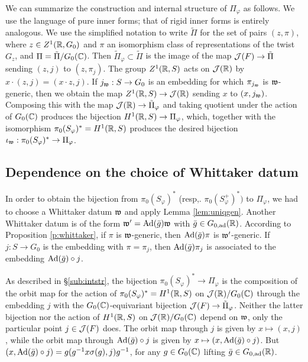 \documentclass{article}
\theoremstyle{definition}
\numberwithin{equation}{section}
\renewcommand{\-}{\hyp{}}
\begin{document}
We can summarize the construction and internal structure of $\Pi_\varphi$ as follows. We use the language of pure inner forms; that of rigid inner forms is entirely analogous. We use the simplified notation to write $\tilde\Pi$ for the set of pairs $(z,\pi)$, where $z \in Z^1(\mathbb{R},G_0)$ and $\pi$ an isomorphism class of representations of the twist $G_z$, and $\Pi=\tilde\Pi/G_0(\mathbb{C})$. Then $\tilde\Pi_\varphi \subset \tilde\Pi$ is the image of the map $\mathcal{J}(F) \to \tilde\Pi$ sending $(z,j)$ to $(z,\pi_j)$. The group $Z^1(\mathbb{R},S)$ acts on $\mathcal{J}(\mathbb{R})$ by $x\cdot (z,j)=(x \cdot z,j)$. If $j_{\mathfrak{w}} : S \to G_0$ is an embedding for which $\pi_{j_{\mathfrak{w}}}$ is $\mathfrak{w}$-generic, then we obtain the map $Z^1(\mathbb{R},S) \to \mathcal{J}(\mathbb{R})$ sending $x$ to $(x,j_{\mathfrak{w}})$. Composing this with the map $\mathcal{J}(\mathbb{R}) \to \tilde\Pi_\varphi$ and taking quotient under the action of $G_0(\mathbb{C})$ produces the bijection $H^1(\mathbb{R},S) \to \Pi_\varphi$, which, together with the isomorphism $\pi_0(S_\varphi)^*=H^1(\mathbb{R},S)$ produces the desired bijection $\iota_{\mathfrak{w}} : \pi_0(S_\varphi)^* \to \Pi_\varphi$.

\subsection{Dependence on the choice of Whittaker datum} \label{sub:whitdep}

In order to obtain the bijection from $\pi_0(S_\varphi)^*$ (resp,. $\pi_0(S_\varphi^+)^*)$ to $\Pi_\varphi$, we had to choose a Whittaker datum $\mathfrak{w}$ and apply Lemma \ref{lem:uniqgen}. Another Whittaker datum is of the form $\mathfrak{w'}=\textrm{Ad}(\bar g)\mathfrak{w}$ with $\bar g \in G_{0,\textrm{ad}}(\mathbb{R})$. According to Proposition \ref{p:whittaker}, if $\pi$ is $\mathfrak{w}$-generic, then $\textrm{Ad}(\bar g)\pi$ is $\mathfrak{w'}$-generic. If $j : S \to G_0$ is the embedding with $\pi=\pi_j$, then $\textrm{Ad}(\bar g)\pi_j$ is associated to the embedding $\textrm{Ad}(\bar g)\circ j$.

As described in \S\ref{sub:intstr}, the bijection $\pi_0(S_\varphi)^* \to \Pi_\varphi$ is the composition of the orbit map for the action of $\pi_0(S_\varphi)^*=H^1(\mathbb{R},S)$ on $\mathcal{J}(\mathbb{R})/G_0(\mathbb{C})$ through the embedding $j$ with the $G_0(\mathbb{C})$-equivariant bijection $\mathcal{J}(F) \to \tilde\Pi_\varphi$. Neither the latter bijection nor the action of $H^1(\mathbb{R},S)$ on $\mathcal{J}(\mathbb{R})/G_0(\mathbb{C})$ depend on $\mathfrak{w}$, only the particular point $j \in \mathcal{J}(F)$ does. The orbit map through $j$ is given by $x \mapsto (x,j)$, while the orbit map through $\textrm{Ad}(\bar g)\circ j$ is given by $x \mapsto (x,\textrm{Ad}(\bar g)\circ j)$. But $(x,\textrm{Ad}(\bar g)\circ j)=g(g^{-1}x\sigma(g),j)g^{-1}$, for any $g \in G_0(\mathbb{C})$ lifting $\bar g \in G_{0,\textrm{ad}}(\mathbb{R})$.
\end{document}
